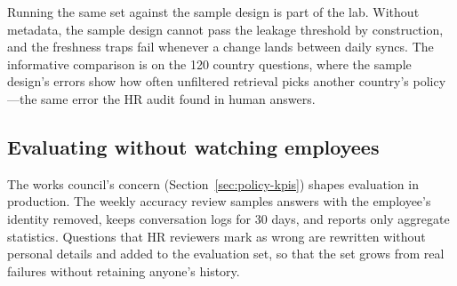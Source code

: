 Running the same set against the sample design is part of the lab. Without metadata, the sample design cannot pass the leakage threshold by construction, and the freshness traps fail whenever a change lands between daily syncs. The informative comparison is on the 120 country questions, where the sample design's errors show how often unfiltered retrieval picks another country's policy---the same error the HR audit found in human answers.

\subsection{Evaluating without watching employees}

The works council's concern (Section~\ref{sec:policy-kpis}) shapes evaluation in production. The weekly accuracy review samples answers with the employee's identity removed, keeps conversation logs for 30 days, and reports only aggregate statistics. Questions that HR reviewers mark as wrong are rewritten without personal details and added to the evaluation set, so that the set grows from real failures without retaining anyone's history.
